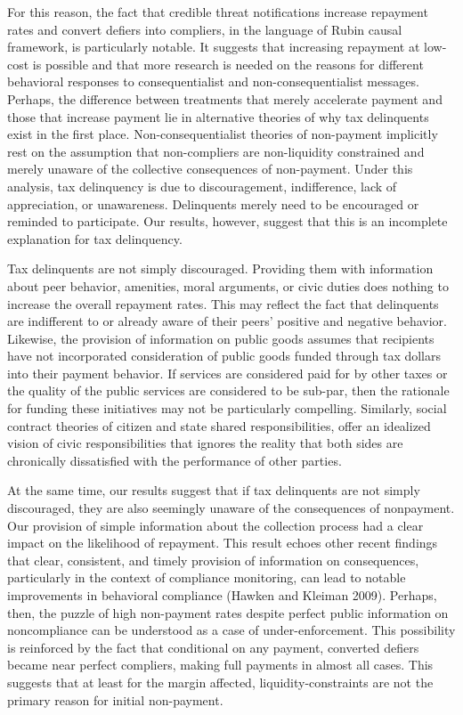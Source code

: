 \documentclass[12pt,titlepage]{article}
\begin{document}
For this reason, the fact that credible threat notifications increase 
repayment rates and convert defiers into compliers, in the language of 
Rubin causal framework, is particularly notable. It suggests that 
increasing repayment at low-cost is possible and that more research is 
needed on the reasons for different behavioral responses to 
consequentialist and non-consequentialist messages. Perhaps, the difference 
between treatments that merely accelerate payment and those that increase 
payment lie in alternative theories of why tax delinquents exist in the 
first place. Non-consequentialist theories of non-payment implicitly rest 
on the assumption that non-compliers are non-liquidity constrained and 
merely unaware of the collective consequences of non-payment. Under this 
analysis, tax delinquency is due to discouragement, indifference, 
lack of appreciation, or unawareness. Delinquents merely need to be 
encouraged or reminded to participate. Our results, however, suggest 
that this is an incomplete explanation for tax delinquency. 

Tax delinquents are not simply discouraged. Providing them with 
information about peer behavior, amenities, moral arguments, or civic 
duties does nothing to increase the overall repayment rates. This may 
reflect the fact that delinquents are indifferent to or already aware 
of their peers’ positive and negative behavior. Likewise, the provision 
of information on public goods assumes that recipients have not 
incorporated consideration of public goods funded through tax dollars 
into their payment behavior. If services are considered paid for by 
other taxes or the quality of the public services are considered to be 
sub-par, then the rationale for funding these initiatives may not be 
particularly compelling.  Similarly, social contract theories of citizen 
and state shared responsibilities, offer an idealized vision of civic 
responsibilities that ignores the reality that both sides are chronically 
dissatisfied with the performance of other parties.

At the same time, our results suggest that if tax delinquents are not 
simply discouraged, they are also seemingly unaware of the consequences 
of nonpayment. Our provision of simple information about the collection 
process had a clear impact on the likelihood of repayment. This result 
echoes other recent findings that clear, consistent, and timely provision 
of information on consequences, particularly in the context of compliance 
monitoring, can lead to notable improvements in behavioral compliance 
(Hawken and Kleiman 2009). Perhaps, then, the puzzle of high non-payment 
rates despite perfect public information on noncompliance can be understood 
as a case of under-enforcement. This possibility is reinforced by the fact 
that conditional on any payment, converted defiers became near perfect 
compliers, making full payments in almost all cases. This suggests that at 
least for the margin affected, liquidity-constraints are not the primary 
reason for initial non-payment.
\end{document}
